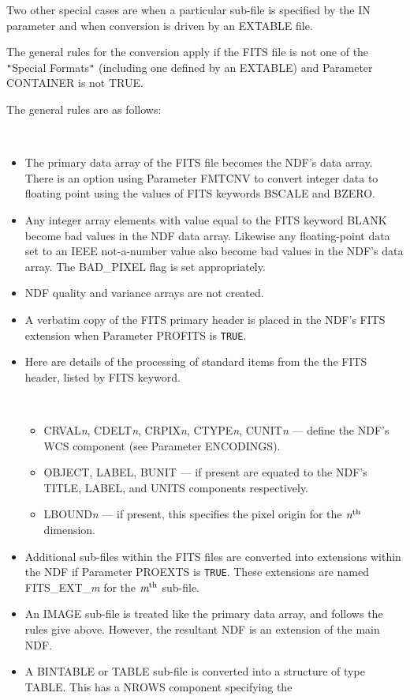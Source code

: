 \documentclass[twoside,11pt]{article}
\newcommand{\latex}[1]{#1}
\newcommand{\xref}[3]{#1}
\newcommand{\ssthitemlist}[1]{
  \latex{
  \mbox{} \\
  \vspace{-3.5ex}
  }
  \begin{itemize}
     #1
  \end{itemize}
}
\newcommand{\sstitem}{\item}
\newcommand{\sstitem}{\item}
\begin{document}
{{      Two other special cases are when a particular sub-file is specified by
      the IN parameter and when conversion is driven by an EXTABLE file.

      The general rules for the conversion apply if the FITS file is not
      one of the \texttt{"}Special Formats\texttt{"} (including one defined by an EXTABLE)
      and Parameter CONTAINER is not TRUE.

      The general rules are as follows:
      \ssthitemlist{
         \sstitem 
         The primary data array of the FITS file becomes the NDF's data
         array. There is an option using Parameter FMTCNV to convert
         integer data to floating point using the values of FITS keywords
         BSCALE and BZERO.
         \sstitem
         Any integer array elements with value equal to the FITS
         keyword BLANK become \xref{bad}{sun95}{se_badmasking} values in
         the NDF data array.  Likewise any floating-point data set to an
         IEEE not-a-number value also become bad values in the NDF's data
         array.  The BAD\_PIXEL flag is set appropriately.
         \sstitem
         NDF quality and variance arrays are not created.
         \sstitem
         A verbatim copy of the FITS primary header is placed in the
         NDF's FITS extension when Parameter PROFITS is \texttt{TRUE}.
         \sstitem
         Here are details of the processing of standard items from the
         the FITS header, listed by FITS keyword.
         \ssthitemlist{
            \sstitem
            CRVAL\textit{n}, CDELT\textit{n}, CRPIX\textit{n}, CTYPE\textit{n},
            CUNIT\textit{n} --- define the NDF's WCS component (see Parameter 
            ENCODINGS).
            \sstitem
            OBJECT, LABEL, BUNIT --- if present are equated to the NDF's
            TITLE, LABEL, and UNITS components respectively.
            \sstitem
            LBOUND\textit{n} --- if present, this specifies the pixel origin
            for the $\textit{n}^{\rm th}$ dimension.
         }
         \sstitem
         Additional sub-files within the FITS files are converted into
         extensions within the NDF if Parameter PROEXTS is \texttt{TRUE}.
         These extensions are named FITS\_EXT\_\textit{m} for the 
         $\textit{m}^{\rm th}$ sub-file.
         \sstitem
         An IMAGE sub-file is treated like the primary data array, and
         follows the rules give above. However, the resultant NDF is an
         extension of the main NDF.
         \sstitem
         A BINTABLE or TABLE sub-file is converted into a structure
         of type TABLE.  This has a NROWS component specifying the
}}}
\end{document}
